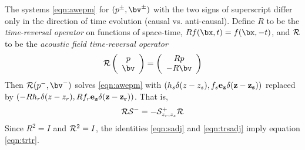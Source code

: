 The systems \ref{eqn:awepm} for $(p^{\pm},\bv^{\pm})$ with the two
signs of superscript differ only in the direction of time evolution (causal vs. anti-causal). Define $R$ to be the {\em time-reversal operator} on functions of space-time,
$Rf(\bx,t) = f(\bx,-t)$, and ${\cal R}$ to be the {\em acoustic field time-reversal operator} 
\begin{equation}
  \label{eqn:trdef}
  {\cal R} \left(
    \begin{array}{c}
      p\\
      \bv
    \end{array}
  \right) =
  \left(
    \begin{array}{c}
      Rp\\
      -R\bv
    \end{array}
  \right)
\end{equation}
Then ${\cal R}(p^-,\bv^-)$ solves \ref{eqn:awepm} with
$(h_s\delta(z-z_s),f_s\bf{e_z}\delta(z-z_s))$ replaced by
$(-Rh_r\delta(z-z_r), Rf_r\bf{e_z}\delta(z-z_r))$. That is,
\begin{equation}
  \label{eqn:trsadj}
  {\cal R}{\cal S}^- = -{\cal S}^+_{z_r,z_s}{\cal R}
\end{equation}
Since $R^2 = I$ and ${\cal R}^2 = I$, the identities \ref{eqn:sadj}
and \ref{eqn:trsadj} imply equation \ref{eqn:trtr}.






